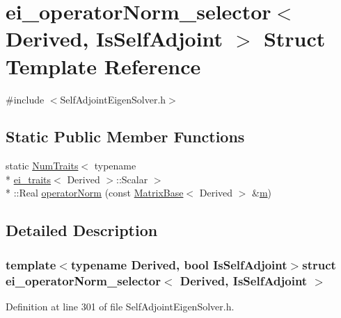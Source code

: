 \hypertarget{structei__operator_norm__selector}{\section{ei\-\_\-operator\-Norm\-\_\-selector$<$ Derived, Is\-Self\-Adjoint $>$ Struct Template Reference}
\label{structei__operator_norm__selector}
}


{\ttfamily \#include $<$Self\-Adjoint\-Eigen\-Solver.\-h$>$}

\subsection*{Static Public Member Functions}
\begin{DoxyCompactItemize}
\item 
static \hyperlink{struct_num_traits}{Num\-Traits}$<$ typename \\*
\hyperlink{structei__traits}{ei\-\_\-traits}$<$ Derived $>$\-::Scalar $>$\\*
\-::Real \hyperlink{structei__operator_norm__selector_aaf65545f690587940456b0c3ab8c3c7f}{operator\-Norm} (const \hyperlink{class_matrix_base}{Matrix\-Base}$<$ Derived $>$ \&\hyperlink{glext_8h_af593500c283bf1a787a6f947f503a5c2}{m})
\end{DoxyCompactItemize}


\subsection{Detailed Description}
\subsubsection*{template$<$typename Derived, bool Is\-Self\-Adjoint$>$struct ei\-\_\-operator\-Norm\-\_\-selector$<$ Derived, Is\-Self\-Adjoint $>$}



Definition at line 301 of file Self\-Adjoint\-Eigen\-Solver.\-h.



